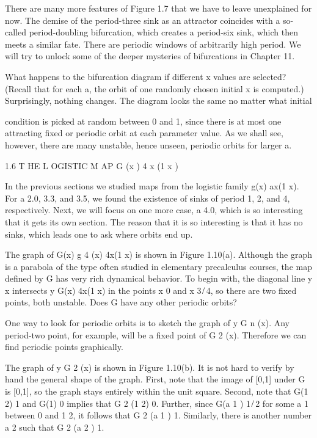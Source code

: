 \documentclass[12pt]{article}
\begin{document}
There are many more features of Figure 1.7 that we have to leave unexplained for now. The demise of the 
period-three sink as an attractor coincides with a so-called period-doubling bifurcation, which creates a 
period-six sink, which then meets a similar fate. There are periodic windows of arbitrarily high period. We 
will try to unlock some of the deeper mysteries of bifurcations in Chapter 11.

What happens to the bifurcation diagram if different x values are selected? (Recall that for each a, the 
orbit of one randomly chosen initial x is computed.) Surprisingly, nothing changes. The diagram looks the 
same no matter what initial

condition is picked at random between 0 and 1, since there is at most one attracting ﬁxed or periodic 
orbit at each parameter value. As we shall see, however, there are many unstable, hence unseen, periodic 
orbits for larger a.

1.6 T HE L OGISTIC M AP G (x )  4 x (1  x )

In the previous sections we studied maps from the logistic family g(x)  ax(1  x). For a  2.0, 3.3, and 3.5, 
we found the existence of sinks of period 1, 2, and 4, respectively. Next, we will focus on one more case, 
a  4.0, which is so interesting that it gets its own section. The reason that it is so interesting is that 
it has no sinks, which leads one to ask where orbits end up.

The graph of G(x)  g 4 (x)  4x(1  x) is shown in Figure 1.10(a). Although the graph is a parabola of the 
type often studied in elementary precalculus courses, the map deﬁned by G has very rich dynamical 
behavior. To begin with, the diagonal line y  x intersects y  G(x)  4x(1  x) in the points x  0 and x  3 ̸ 
4, so there are two ﬁxed points, both unstable. Does G have any other periodic orbits?

One way to look for periodic orbits is to sketch the graph of y  G n (x). Any period-two point, for 
example, will be a ﬁxed point of G 2 (x). Therefore we can ﬁnd periodic points graphically.

The graph of y  G 2 (x) is shown in Figure 1.10(b). It is not hard to verify by hand the general shape of 
the graph. First, note that the image of [0,1] under G is [0,1], so the graph stays entirely within the 
unit square. Second, note that G(1  2)  1 and G(1)  0 implies that G 2 (1  2)  0. Further, since G(a 1 )  1 
̸ 2 for some a 1 between 0 and 1  2, it follows that G 2 (a 1 )  1. Similarly, there is another number a 2 
such that G 2 (a 2 )  1.
\end{document}
